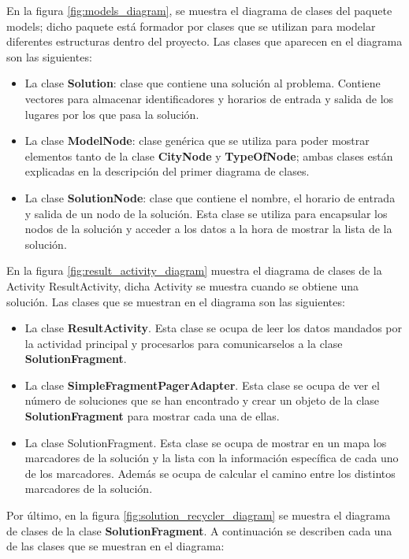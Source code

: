 \vspace{0.06in}
En la figura \ref{fig:models_diagram}, se muestra el diagrama de clases del paquete models; dicho paquete está formador por clases que se utilizan para modelar diferentes estructuras dentro del proyecto. Las clases que aparecen en el diagrama son las siguientes:
\begin{itemize}
	\item La clase \textbf{Solution}: clase que contiene una solución al problema. Contiene vectores para almacenar identificadores y horarios de entrada y salida de los lugares por los que pasa la solución.
	\item La clase \textbf{ModelNode}: clase genérica que se utiliza para poder mostrar elementos tanto de la clase \textbf{CityNode} y \textbf{TypeOfNode}; ambas clases están explicadas en la descripción del primer diagrama de clases.
	\item La clase \textbf{SolutionNode}: clase que contiene el nombre, el horario de entrada y salida de un nodo de la solución. Esta clase se utiliza para encapsular los nodos de la solución y acceder a los datos a la hora de mostrar la lista de la solución.
\end{itemize}
\vspace{0.06in}
En la figura \ref{fig:result_activity_diagram} muestra el diagrama de clases de la Activity ResultActivity, dicha Activity se muestra cuando se obtiene una solución. Las clases que se muestran en el diagrama son las siguientes:
\begin{itemize}
	\item La clase \textbf{ResultActivity}. Esta clase se ocupa de leer los datos mandados por la actividad principal y procesarlos para comunicarselos a la clase \textbf{SolutionFragment}.
	\item La clase \textbf{SimpleFragmentPagerAdapter}. Esta clase se ocupa de ver el número de soluciones que se han encontrado y crear un objeto de la clase \textbf{SolutionFragment} para mostrar cada una de ellas.
	\item La clase SolutionFragment. Esta clase se ocupa de mostrar en un mapa los marcadores de la solución y la lista con la información específica de cada uno de los marcadores. Además se ocupa de calcular el camino entre los distintos marcadores de la solución.
\end{itemize}
\vspace{0.06in}
Por último, en la figura \ref{fig:solution_recycler_diagram} se muestra el diagrama de clases de la clase \textbf{SolutionFragment}. A continuación se describen cada una de las clases que se muestran en el diagrama:
